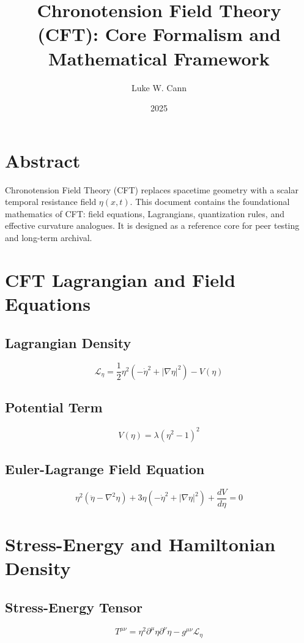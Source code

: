 \documentclass{article}
\title{Chronotension Field Theory (CFT): Core Formalism and Mathematical Framework}
\author{Luke W. Cann}
\date{2025}
\begin{document}
\maketitle

\section*{Abstract}
Chronotension Field Theory (CFT) replaces spacetime geometry with a scalar temporal resistance field \(\eta(x,t)\). This document contains the foundational mathematics of CFT: field equations, Lagrangians, quantization rules, and effective curvature analogues. It is designed as a reference core for peer testing and long-term archival.

\section{CFT Lagrangian and Field Equations}

\subsection{Lagrangian Density}
\begin{equation}
\mathcal{L}_\eta = \frac{1}{2} \eta^2 ( -\dot{\eta}^2 + |\nabla \eta|^2 ) - V(\eta)
\end{equation}

\subsection{Potential Term}
\begin{equation}
V(\eta) = \lambda (\eta^2 - 1)^2
\end{equation}

\subsection{Euler-Lagrange Field Equation}
\begin{equation}
\eta^2 (\ddot{\eta} - \nabla^2 \eta) + 3\eta ( -\dot{\eta}^2 + |\nabla \eta|^2 ) + \frac{dV}{d\eta} = 0
\end{equation}

\section{Stress-Energy and Hamiltonian Density}

\subsection{Stress-Energy Tensor}
\begin{equation}
T^{\mu \nu} = \eta^2 \partial^\mu \eta \partial^\nu \eta - g^{\mu \nu} \mathcal{L}_\eta
\end{equation}
\end{document}

